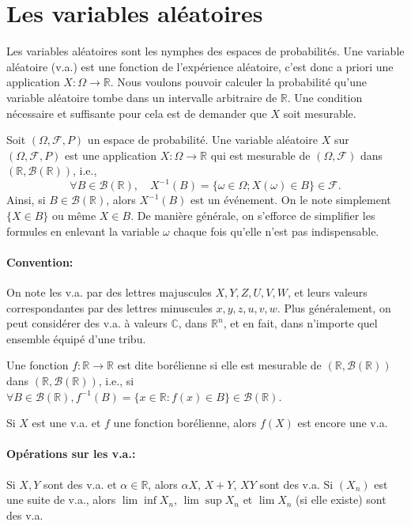 \section{Les variables aléatoires}
Les variables aléatoires sont les nymphes des espaces de probabilités. Une variable aléatoire (v.a.) est une fonction de l'expérience aléatoire, c'est donc a priori une application $X : \Omega \to \mathbb{R}$. Nous voulons pouvoir calculer la probabilité qu'une variable aléatoire tombe dans un intervalle arbitraire de $\mathbb{R}$. Une condition nécessaire et suffisante pour cela est de demander que $X$ soit mesurable.
\begin{definition}
Soit $(\Omega, \mathcal{F}, P)$ un espace de probabilité. Une variable aléatoire $X$ sur $(\Omega, \mathcal{F}, P)$ est une application $X : \Omega \to \mathbb{R}$ qui est mesurable de $(\Omega, \mathcal{F})$ dans $(\mathbb{R}, \mathcal{B}(\mathbb{R}))$, i.e.,
\[ \forall B \in \mathcal{B}(\mathbb{R}), \quad X^{-1}(B) = \{\omega \in \Omega; X(\omega) \in B\} \in \mathcal{F}. \]
Ainsi, si $B \in \mathcal{B}(\mathbb{R})$, alors $X^{-1}(B)$ est un événement. On le note simplement $\{X \in B\}$ ou même $X \in B$. De manière générale, on s'efforce de simplifier les formules en enlevant la variable $\omega$ chaque fois qu'elle n'est pas indispensable.
\end{definition}
\paragraph{Convention:} On note les v.a. par des lettres majuscules $X, Y, Z, U, V, W$, et leurs valeurs correspondantes par des lettres minuscules $x, y, z, u, v, w$.
Plus généralement, on peut considérer des v.a. à valeurs $\mathbb{C}$, dans $\mathbb{R}^n$, et en fait, dans n'importe quel ensemble équipé d'une tribu.
\begin{definition}
Une fonction $f : \mathbb{R} \to \mathbb{R}$ est dite borélienne si elle est mesurable de $(\mathbb{R}, \mathcal{B}(\mathbb{R}))$ dans $(\mathbb{R}, \mathcal{B}(\mathbb{R}))$, i.e., si $\forall B \in \mathcal{B}(\mathbb{R}), f^{-1}(B) = \{x \in \mathbb{R} : f(x) \in B\} \in \mathcal{B}(\mathbb{R})$.
\end{definition}
\begin{example}
Si $X$ est une v.a. et $f$ une fonction borélienne, alors $f(X)$ est encore une v.a.
\end{example}
\paragraph{Opérations sur les v.a.:}
Si $X, Y$ sont des v.a. et $\alpha \in \mathbb{R}$, alors $\alpha X$, $X+Y$, $XY$ sont des v.a.
Si $(X_n)$ est une suite de v.a., alors $\lim\inf X_n$, $\lim\sup X_n$ et $\lim X_n$ (si elle existe) sont des v.a.
